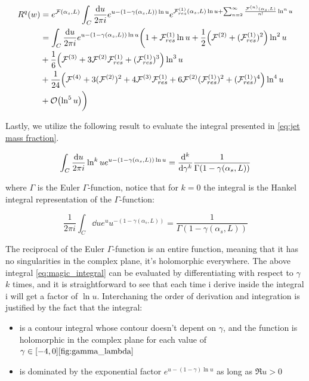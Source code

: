 \documentclass[../main.tex]{subfiles}
\begin{document}
\begin{align}
    \begin{split}
        R^q(w) &= e^{\mathcal{F}(\alpha_s,L)} \int_C \frac{\dd u}{2\pi i} e^{u-(1-\gamma(\alpha_s,L))\ln u} e^{\mathcal{F}^{(1)}_{res}(\alpha_s,L) \ln u +\sum_{n=2}^\infty \frac{\mathcal{F}^{(n)}(\alpha_s,L)}{n!}  \ln^n u}\\
        &= \int_C \frac{\dd u}{2\pi i} e^{u-(1-\gamma(\alpha_s,L))\ln u} \biggl( 1 + \mathcal{F}^{(1)}_{res}\ln u +\frac{1}{2}\qty( \mathcal{F}^{(2)}+(\mathcal{F}^{(1)}_{res})^2)\ln^2 u \\
        &+ \frac{1}{6}\qty(\mathcal{F}^{(3)} + 3 \mathcal{F}^{(2)}\mathcal{F}^{(1)}_{res} + (\mathcal{F}^{(1)}_{res})^3 ) \ln^3 u \\
        &+ \frac{1}{24}\qty(\mathcal{F}^{(4)} + 3(\mathcal{F}^{(2)})^2 + 4 \mathcal{F}^{(3)} \mathcal{F}^{(1)}_{res} + 6 \mathcal{F}^{(2)} (\mathcal{F}^{(1)}_{res})^2 + (\mathcal{F}^{(1)}_{res})^4 )\ln^4 u \\
        &+ \order{\ln^5 u} \biggr)
    \end{split}
\end{align}

Lastly, we utilize the following result to evaluate the integral presented in \cref{eq:jet mass fraction}.

\begin{equation}\label{eq:magic_integral}
    \int_C \frac{\dd u}{2\pi i} \ln^k u e^{u-(1-\gamma(\alpha_s,L))\ln u} = \dv[k]{\gamma} \frac{1}{\Gamma(1-\gamma(\alpha_s,L))}
\end{equation}

where $\Gamma$ is the Euler $\Gamma$-function, notice that for $k=0$ the integral is the Hankel integral representation of the $\Gamma$-function:

\begin{equation}\label{eq:hankel_integral_representation}
    \frac{1}{2\pi i}\int_C \dd u e^{u} u^{-(1-\gamma(\alpha_s,L))} = \frac{1}{\Gamma(1-\gamma(\alpha_s,L))}
\end{equation}

The reciprocal of the Euler $\Gamma$-function is an entire function, meaning that it has no singularities in the complex plane, it's holomorphic everywhere.
The above integral \cref{eq:magic_integral} can be evaluated by differentiating with respect to $\gamma$ $k$ times, and it is straightforward to see that each time i derive inside the integral
i will get a factor of $\ln u$. Interchaning the order of derivation and integration is justified by the fact that the integral:
\begin{itemize}
    \item  is a contour integral whose contour doesn't depent on $\gamma$, and the function is holomorphic in the complex plane for each value of $\gamma \in [-4,0] \cref{fig:gamma_lambda}$
    \item  is dominated by the exponential factor $e^{u - (1-\gamma) \ln u}$ as long as $\Re{u}>0$
\end{itemize}
\end{document}
